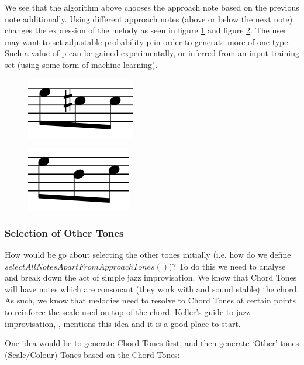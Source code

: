 \documentclass[pdftex,12pt,a4paper]{report}
\begin{document}
We see that the algorithm above chooses the approach note based on the previous note additionally. Using different approach notes (above or below the next note) changes the expression of the melody as seen in figure \ref{fig:approachnormal} and figure \ref{fig:approachenclosure}. The user may want to set adjustable probability p in order to generate more of one type. Such a value of p can be gained experimentally, or inferred from an input training set (using some form of machine learning).

\begin{figure}[h]
  \centering
  \includegraphics[scale=0.4]{figure/approachnormal.png}
  \label{fig:approachnormal}
\end{figure}

\begin{figure}[h]
  \centering
  \includegraphics[scale=0.4]{figure/approachenclosure.png}
  \label{fig:approachenclosure}
\end{figure}

\subsubsection{Selection of Other Tones}
How would be go about selecting the other tones initially (i.e. how do we define $selectAllNotesApartFromApproachTones()$)? To do this we need to analyse and break down the act of simple jazz improvisation. We know that Chord Tones will have notes which are consonant (they work with and sound stable) the chord. As such, we know that melodies need to resolve to Chord Tones at certain points to reinforce the scale used on top of the chord. Keller's guide to jazz improvisation, \cite{jazzkeller}, mentions this idea and it is a good place to start.

One idea would be to generate Chord Tones first, and then generate `Other' tones (Scale/Colour) Tones based on the Chord Tones:
\end{document}
